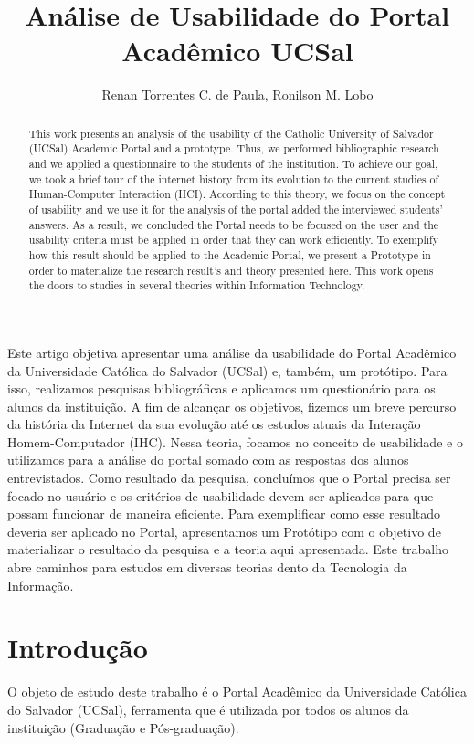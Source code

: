 \documentclass[12pt]{article}
\title{Análise de Usabilidade do Portal Acadêmico UCSal}
\author{Renan Torrentes C. de Paula\inst{1}, Ronilson M. Lobo\inst{2} }
\begin{document}
 

\maketitle

\begin{abstract}
  This work presents an analysis of the usability of the Catholic University of Salvador (UCSal) Academic Portal and a prototype. Thus, we performed bibliographic research and we applied a questionnaire to the students of the institution. To achieve our goal, we took a brief tour of the internet history from its evolution to the current studies of Human-Computer Interaction (HCI). According to this theory, we focus on the concept of usability and we use it for the analysis of the portal added the interviewed students’ answers. As a result, we concluded the Portal needs to be focused on the user and the usability criteria must be applied in order that they can work efficiently. To exemplify how this result should be applied to the Academic Portal, we present a Prototype in order to materialize the research result's and theory presented here. This work opens the doors to studies in several theories within Information Technology.
\end{abstract}
     
\begin{resumo} 
  Este artigo objetiva apresentar uma análise da usabilidade do Portal Acadêmico da Universidade Católica do Salvador (UCSal) e, também, um protótipo. Para isso, realizamos pesquisas bibliográficas e aplicamos um questionário para os alunos da instituição. A fim de alcançar os objetivos, fizemos um breve percurso da história da Internet da sua evolução até os estudos atuais da Interação Homem-Computador (IHC). Nessa teoria, focamos no conceito de usabilidade e o utilizamos para a análise do portal somado com as respostas dos alunos entrevistados. Como resultado da pesquisa, concluímos que o Portal precisa ser focado no usuário e os critérios de usabilidade devem ser aplicados para que possam funcionar de maneira eficiente. Para exemplificar como esse resultado deveria ser aplicado no Portal, apresentamos um Protótipo com o objetivo de materializar o resultado da pesquisa e a teoria aqui apresentada. Este trabalho abre caminhos para estudos em diversas teorias dento da Tecnologia da Informação.
\end{resumo}


\section{Introdução}
O objeto de estudo deste trabalho é o Portal Acadêmico da Universidade Católica do Salvador (UCSal), ferramenta que é utilizada por todos os alunos da instituição (Graduação e Pós-graduação). 
\end{document}
